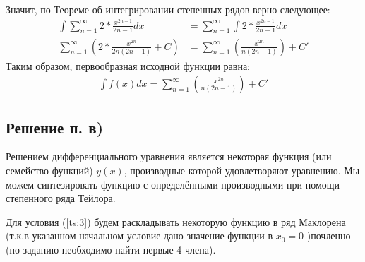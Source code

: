\documentclass[12pt, a4paper]{article}
\begin{document}
Значит, по Теореме об интегрировании степенных рядов верно следующее:
\begin{equation} \label{sol:2:3}
\begin{aligned}
\int\sum_{n=1}^{\infty} 2*\frac{x^{2n-1}}{2n-1} dx &= \sum_{n=1}^{\infty}\int 2*\frac{x^{2n-1}}{2n-1} dx\\
 \sum_{n=1}^{\infty} \left(2*\frac{x^{2n}}{2n(2n-1)} + C\right) &= \sum_{n=1}^{\infty}\left( \frac{x^{2n}}{n(2n-1)}\right) + C'
\end{aligned}
\end{equation}
Таким образом, первообразная исходной функции равна:
\begin{equation*}
\begin{aligned}
\int f(x) dx =  \sum_{n=1}^{\infty}\left( \frac{x^{2n}}{n(2n-1)}\right) + C'
\end{aligned}
\end{equation*}
\subsection{Решение п. в)}
Решением дифференциального уравнения является некоторая функция (или семейство функций) $y(x)$, производные которой удовлетворяют уравнению. Мы можем синтезировать функцию с определёнными производными при помощи степенного ряда Тейлора.


Для условия (\ref{ts:3}) будем раскладывать некоторую функцию в ряд Маклорена (т.к.в указанном начальном условие дано значение функции в $x_0=0$ )почленно (по заданию необходимо найти первые 4 члена).
\end{document}
